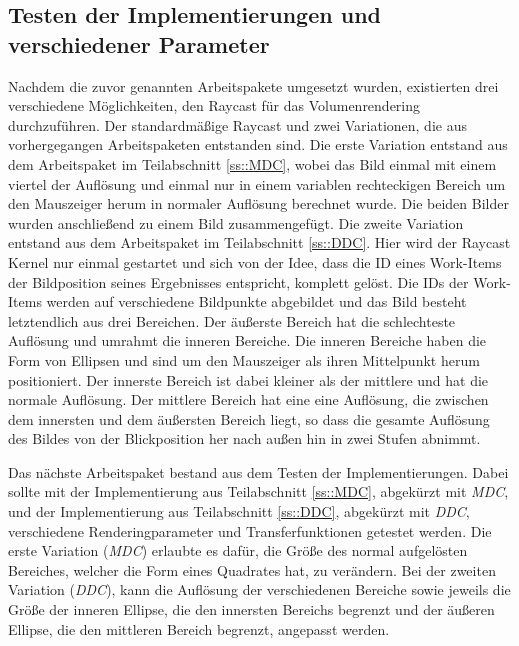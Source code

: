 \subsection{Testen der Implementierungen und verschiedener Parameter}
Nachdem die zuvor genannten Arbeitspakete umgesetzt wurden, existierten drei verschiedene Möglichkeiten, den Raycast für das Volumenrendering durchzuführen.
Der standardmäßige Raycast und zwei Variationen, die aus vorhergegangen Arbeitspaketen entstanden sind.
Die erste Variation entstand aus dem Arbeitspaket im Teilabschnitt \ref{ss::MDC}, wobei das Bild einmal mit einem viertel der Auflösung und einmal nur in einem variablen rechteckigen Bereich um den Mauszeiger herum in normaler Auflösung berechnet wurde.
Die beiden Bilder wurden anschließend zu einem Bild zusammengefügt.
Die zweite Variation entstand aus dem Arbeitspaket im Teilabschnitt \ref{ss::DDC}.
Hier wird der Raycast Kernel nur einmal gestartet und sich von der Idee, dass die ID eines Work-Items der Bildposition seines Ergebnisses entspricht, komplett gelöst.
Die IDs der Work-Items werden auf verschiedene Bildpunkte abgebildet und das Bild besteht letztendlich aus drei Bereichen.
Der äußerste Bereich hat die schlechteste Auflösung und umrahmt die inneren Bereiche.
Die inneren Bereiche haben die Form von Ellipsen und sind um den Mauszeiger als ihren Mittelpunkt herum positioniert.
Der innerste Bereich ist dabei kleiner als der mittlere und hat die normale Auflösung.
Der mittlere Bereich hat eine eine Auflösung, die zwischen dem innersten und dem äußersten Bereich liegt, so dass die gesamte Auflösung des Bildes von der Blickposition her nach außen hin in zwei Stufen abnimmt.

Das nächste Arbeitspaket bestand aus dem Testen der Implementierungen.
Dabei sollte mit der Implementierung aus Teilabschnitt \ref{ss::MDC}, abgekürzt mit \emph{MDC}, und der Implementierung aus Teilabschnitt \ref{ss::DDC}, abgekürzt mit \emph{DDC}, verschiedene Renderingparameter und Transferfunktionen getestet werden.
Die erste Variation (\emph{MDC}) erlaubte es dafür, die Größe des normal aufgelösten Bereiches, welcher die Form eines Quadrates hat, zu verändern.
Bei der zweiten Variation (\emph{DDC}), kann die Auflösung der verschiedenen Bereiche sowie jeweils die Größe der inneren Ellipse, die den innersten Bereichs begrenzt und der äußeren Ellipse, die den mittleren Bereich begrenzt, angepasst werden.

